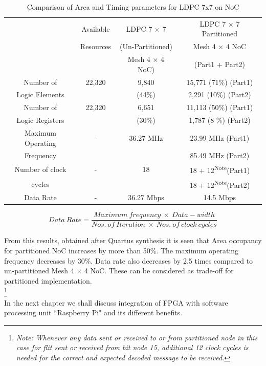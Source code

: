 \begin{table} [H]
\caption{Comparison of Area and Timing parameters for LDPC 7x7 on NoC}
\begin{center}
\begin{tabular}{|| c || c | c | c ||}
\hline
				& Available  	& LDPC 7 $\times$ 7    	& LDPC 7 $\times$ 7 Partitioned			\\ 
				& Resources  	& (Un-Partitioned)     	& Mesh 4 $\times$ 4 NoC				\\
				&		& Mesh 4 $\times$ 4 NoC)& (Part1 + Part2) 				\\ \hline
	Number of		& 22,320     	& 9,840      	      	& 15,771 (71\%) (Part1) 			\\ 
	Logic Elements		&		& (44\%)		& 2,291  (10\%) (Part2)				\\ \hline
	Number of 		& 22,320     	& 6,651	              	& 11,113 (50\%) (Part1)				\\ 
	Logic Registers		&		& (30\%) 	      	& 1,787  (8 \%) (Part2)				\\ \hline
	Maximum Operating	& -          	& 36.27 MHz           	& 23.99 MHz 	(Part1)				\\  
	Frequency		&            	&                     	& 85.49 MHz	(Part2)				\\ \hline
	Number of clock		& -          	& 18                  	& 18 + 12\textsuperscript{Note}(Part1)		\\ 
	cycles			&		&			& 18 + 12\textsuperscript{Note}(Part2)		\\ \hline
	Data Rate		& -		& 36.27 Mbps		& 14.5 Mbps      				\\ \hline
\end{tabular}
\end{center}
\label{cyclone4E_comparison_ldpc_7x7}
\end{table}
\begin{equation} \label {data_rate_formula}
 Data\ Rate = \frac {Maximum\ frequency\ \times \ Data-width}{Nos.\ of\ Iteration\ \times \ Nos.\ of\ clock\ cycles} 
\end{equation}

From this results, obtained after Quartus synthesis it is seen that Area occupancy for partitioned NoC increases by more than 50\%. The maximum operating frequency decreases by 30\%. Data rate also decreases by 2.5 times compared to un-partitioned Mesh 4 $\times$ 4 NoC. These can be considered as trade-off for partitioned implementation.\\


\footnote{\textit{Note: Whenever any data sent or received to or from partitioned node in this case for flit sent or received from bit node 15, additional 12 clock cycles is needed for the correct and expected decoded message to be received.}}\\

In the next chapter we shall discuss integration of FPGA with software processing unit ``Raspberry Pi" and its different benefits.

